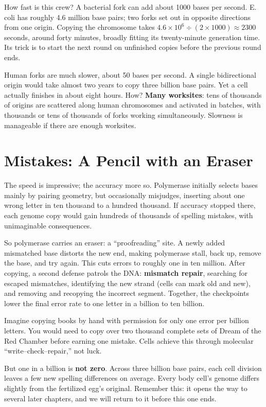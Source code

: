 \begin{qiaoliang}
How fast is this crew? A bacterial fork can add about 1000 bases per second. E. coli has roughly 4.6 million base pairs; two forks set out in opposite directions from one origin. Copying the chromosome takes $4.6\times10^{6}\div(2\times1000)\approx2300$ seconds, around forty minutes, broadly fitting its twenty-minute generation time. Its trick is to start the next round on unfinished copies before the previous round ends.

Human forks are much slower, about 50 bases per second. A single bidirectional origin would take almost two years to copy three billion base pairs. Yet a cell actually finishes in about eight hours. How? \textbf{Many worksites}: tens of thousands of origins are scattered along human chromosomes and activated in batches, with thousands or tens of thousands of forks working simultaneously. Slowness is manageable if there are enough worksites.
\end{qiaoliang}

\section{Mistakes: A Pencil with an Eraser}

The speed is impressive; the accuracy more so. Polymerase initially selects bases mainly by pairing geometry, but occasionally misjudges, inserting about one wrong letter in ten thousand to a hundred thousand. If accuracy stopped there, each genome copy would gain hundreds of thousands of spelling mistakes, with unimaginable consequences.

So polymerase carries an eraser: a ``proofreading'' site. A newly added mismatched base distorts the new end, making polymerase stall, back up, remove the base, and try again. This cuts errors to roughly one in ten million. After copying, a second defense patrols the DNA: \textbf{mismatch repair}, searching for escaped mismatches, identifying the new strand (cells can mark old and new), and removing and recopying the incorrect segment. Together, the checkpoints lower the final error rate to one letter in a billion to ten billion.

Imagine copying books by hand with permission for only one error per billion letters. You would need to copy over two thousand complete sets of Dream of the Red Chamber before earning one mistake. Cells achieve this through molecular ``write--check--repair,'' not luck.

But one in a billion is \textbf{not zero}. Across three billion base pairs, each cell division leaves a few new spelling differences on average. Every body cell's genome differs slightly from the fertilized egg's original. Remember this: it opens the way to several later chapters, and we will return to it before this one ends.

